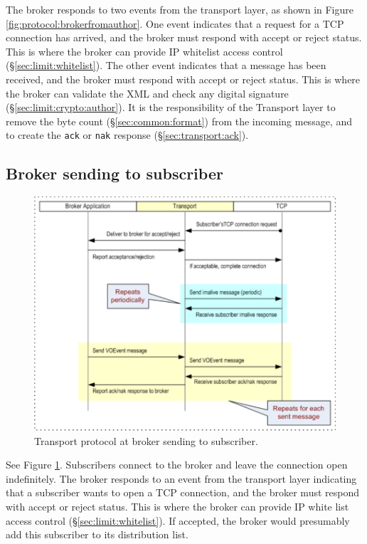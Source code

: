\documentclass[a4paper,11pt]{ivoa}
\begin{document}
The broker responds to two events from the transport layer, as shown in Figure
\ref{fig:protocol:brokerfromauthor}. One event indicates that a request for a
TCP connection has arrived, and the broker must respond with accept or reject
status. This is where the broker can provide IP whitelist access control
(\S\ref{sec:limit:whitelist}). The other event indicates that a message has
been received, and the broker must respond with accept or reject status. This
is where the broker can validate the XML and check any digital signature
(\S\ref{sec:limit:crypto:author}). It is the responsibility of the Transport
layer to remove the byte count (\S\ref{sec:common:format}) from the incoming
message, and to create the \texttt{ack} or \texttt{nak} response
(\S\ref{sec:transport:ack}).

\subsection{Broker sending to subscriber}

\begin{figure}[H]
  \begin{center}
  \includegraphics{figures/brokertosub.pdf}
  \end{center}

  \caption{Transport protocol at broker sending to subscriber.}

  \label{fig:protocol:brokertosub}
\end{figure}

See Figure \ref{fig:protocol:brokertosub}. Subscribers connect to the broker
and leave the connection open indefinitely. The broker responds to an event
from the transport layer indicating that a subscriber wants to open a TCP
connection, and the broker must respond with accept or reject status. This is
where the broker can provide IP white list access control
(\S\ref{sec:limit:whitelist}). If accepted, the broker would presumably add
this subscriber to its distribution list.
\end{document}
